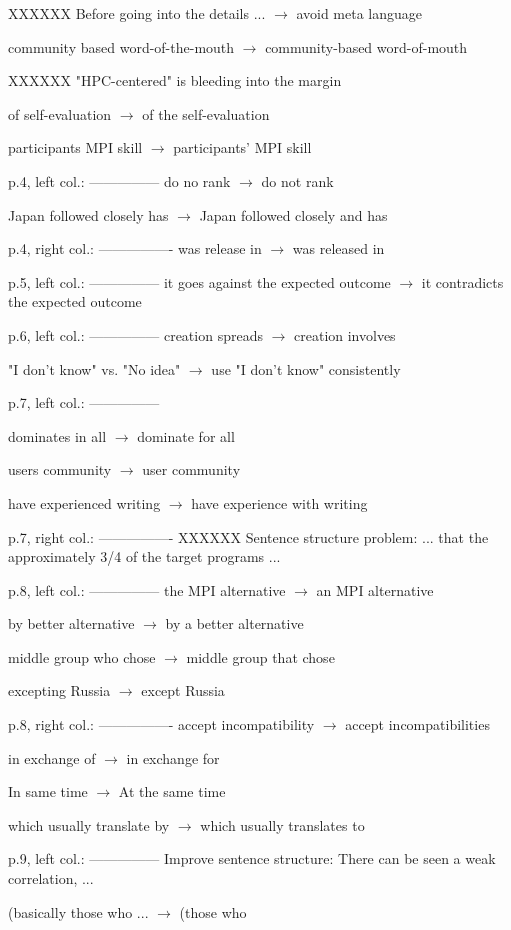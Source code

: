 \documentclass[11pt]{article}
\begin{document}
{XXXXXX Before going into the details ... $\to$ avoid meta language

community based word-of-the-mouth $\to$ community-based word-of-mouth

XXXXXX "HPC-centered" is bleeding into the margin

of self-evaluation $\to$ of the self-evaluation

participants MPI skill $\to$ participants' MPI skill

p.4, left col.:
---------------
do no rank $\to$ do not rank

Japan followed closely has $\to$ Japan followed closely and has

p.4, right col.:
----------------
was release in $\to$ was released in

p.5, left col.:
---------------
it goes against the expected outcome $\to$
it contradicts the expected outcome

p.6, left col.:
---------------
creation spreads $\to$ creation involves

"I don't know" vs. "No idea" $\to$ use "I don't know" consistently

p.7, left col.:
---------------

dominates in all $\to$ dominate for all

users community $\to$ user community

have experienced writing $\to$ have experience with writing

p.7, right col.:
----------------
XXXXXX Sentence structure problem:
... that the approximately 3/4 of the target programs ...

p.8, left col.:
---------------
the MPI alternative $\to$ an MPI alternative

by better alternative $\to$ by a better alternative

middle group who chose $\to$ middle group that chose

excepting Russia $\to$ except Russia

p.8, right col.:
----------------
accept incompatibility $\to$ accept incompatibilities

in exchange of $\to$ in exchange for

In same time $\to$ At the same time

which usually translate by $\to$ which usually translates to

p.9, left col.:
---------------
Improve sentence structure:
There can be seen a weak correlation, ...

(basically those who ... $\to$ (those who

}
\end{document}
